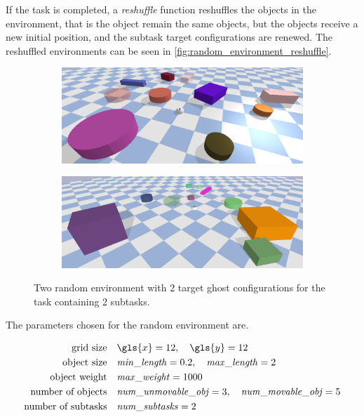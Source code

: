 If the task is completed, a \textit{reshuffle} function reshuffles the objects in the environment, that is the object remain the same objects, but the objects receive a new initial position, and the subtask target configurations are renewed. The reshuffled environments can be seen in \cref{fig:random_environment_reshuffle}.\bs

\begin{figure}[H]
    \centering
    \begin{subfigure}{\textwidth}
    \centering
    \includegraphics[width=1.0\textwidth]{figures/tests/random_1}
    \end{subfigure}
    \begin{subfigure}{\textwidth}
    \centering
    \includegraphics[width=1.0\textwidth]{figures/tests/random_2}
    \end{subfigure}
    \caption{Two random environment with 2 target ghost configurations for the task containing 2 subtasks.}%
    \label{fig:random_environnment}
\end{figure}

The parameters chosen for the random environment are.\bs

\begin{center}
\begin{align*}
\text{grid size} \quad &\gls{x}=12, \quad \gls{y}=12 \\
\text{object size} \quad &\mathit{min\_length}=0.2, \quad \mathit{max\_length}=2 \\
\text{object weight} \quad &\mathit{max\_weight}=1000 \\
\text{number of objects} \quad &\mathit{num\_unmovable\_obj}=3, \quad \mathit{num\_movable\_obj}=5 \\
\text{number of subtasks} \quad &\mathit{num\_subtasks}=2
\end{align*}
\end{center}

